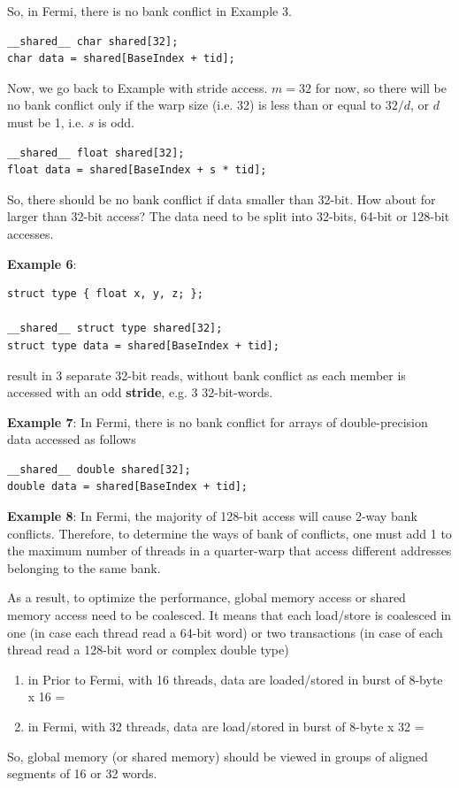 So, in Fermi, there is no bank conflict in Example 3. 
\begin{lstlisting}
__shared__ char shared[32]; 
char data = shared[BaseIndex + tid];
\end{lstlisting}

Now, we go back to Example with stride access. $m=32$ for now, so
there will be no bank conflict only if the warp size (i.e. 32) is less
than or equal to $32/d$, or $d$ must be 1, i.e. $s$ is odd.
\begin{lstlisting}
__shared__ float shared[32]; 
float data = shared[BaseIndex + s * tid];
\end{lstlisting}

So, there should be no bank conflict if data smaller than 32-bit. How
about for larger than 32-bit access? The data need to be split into
32-bits, 64-bit or 128-bit accesses. 

{\bf Example 6}: 
\begin{lstlisting}
struct type { float x, y, z; }; 

__shared__ struct type shared[32]; 
struct type data = shared[BaseIndex + tid];
\end{lstlisting}
result in 3 separate 32-bit reads, without bank conflict as each
member is accessed with an odd {\bf stride}, e.g. 3 32-bit-words.

{\bf Example 7}: In Fermi, there is no bank conflict for arrays of
double-precision data accessed as follows
\begin{lstlisting}
__shared__ double shared[32]; 
double data = shared[BaseIndex + tid];
\end{lstlisting}

{\bf Example 8}: In Fermi, the majority of 128-bit access will cause
2-way bank conflicts. Therefore, to determine the ways of bank of
conflicts, one must add 1 to the maximum number of threads in a
quarter-warp that access different addresses belonging to the same bank.


As a result, to optimize the performance, global memory access or
shared memory access need to be coalesced. It means that each
load/store is coalesced in one (in case each thread read a 64-bit
word) or two transactions (in case of each thread read a 128-bit word
or complex double type)
\begin{enumerate}
\item in Prior to Fermi, with 16 threads, data are loaded/stored in
  burst of 8-byte x 16 =

\item in Fermi, with 32 threads, data are load/stored in burst of
  8-byte x 32 =
\end{enumerate}
So, global memory (or shared memory) should be viewed in groups of
aligned segments of 16 or 32 words.

